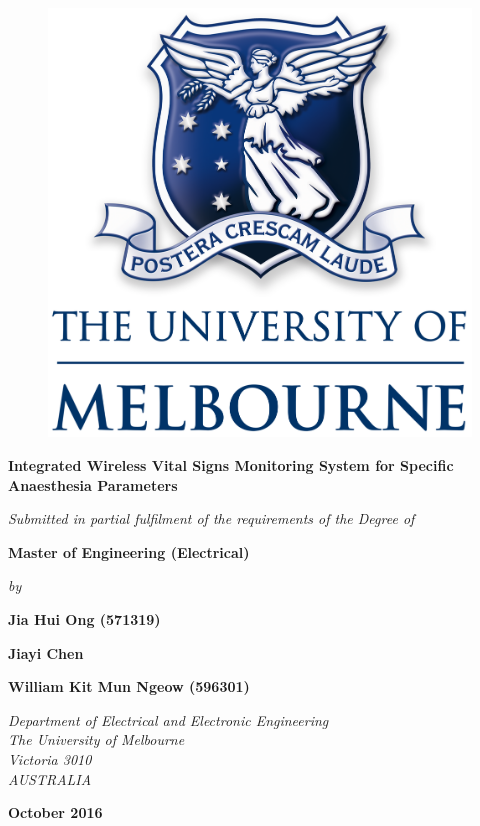 
\thispagestyle{empty}
\vspace{1cm}

\begin{figure}[H]
	\centering
	\includegraphics[width=0.25\linewidth]{unimelblogo.png}
	\label{unimelblogo}
\end{figure}

\vspace{1cm}

\begin{center}
	\Large{ \bf  Integrated Wireless Vital Signs Monitoring System for Specific Anaesthesia Parameters}
\end{center}

\vspace{1cm}

\begin{center}
	{\it  Submitted in partial fulfilment of the requirements of the Degree of }
\end{center}

\begin{center}
	{\bf   Master of Engineering (Electrical)}
\end{center}

\begin{center}
	{\it by }
\end{center}

\begin{center}
	{ \bf Jia Hui Ong (571319)}
\end{center}
\begin{center}
	{ \bf Jiayi Chen }
\end{center}
\begin{center}
	{ \bf William Kit Mun Ngeow (596301)}
\end{center}

\vspace{1cm}

\begin{center}
	{\it Department of Electrical and Electronic Engineering }  \\
	{ \it  The University of Melbourne   }  \\
	{ \it  Victoria 3010   }   \\
	{ \it  AUSTRALIA   }
\end{center}

\vspace{1cm}

\begin{center}
	{\bf  October 2016 }
\end{center}

